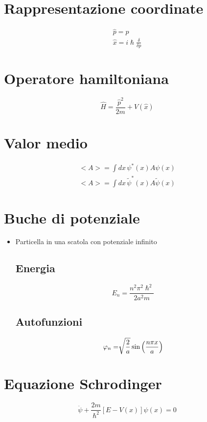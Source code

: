 \section{Rappresentazione coordinate}
\begin{gather*}
    \hat{p} = p \\
    \hat{x} = i \hslash \frac{\delta}{\delta p}
\end{gather*}

\section{Operatore hamiltoniana}
\begin{equation*}
    \hat{H} = \frac{\hat{p}^2}{2m} + V(\hat{x})
\end{equation*}

\section{Valor medio}
\begin{gather*}
    <A> = \int dx \, \psi^*(x)A\psi(x) \\
    <A> = \int dx \, \tilde{\psi}^*(x) A \tilde{\psi}(x)
\end{gather*}

\section{Buche di potenziale}

\begin{itemize}
    \item Particella in una scatola con potenziale infinito
        \subsection*{Energia}
        \begin{equation*}
            E_n = \frac{n^2 \pi^2 \hslash^2}{2a^2m}
        \end{equation*}
        \subsection*{Autofunzioni}
        \begin{equation*}
            \varphi_n = \sqrt[]{\frac{2}{a}}\sin \left(\frac{n\pi x}{a}\right)
        \end{equation*}
\end{itemize}

\section{Equazione Schrodinger}
\begin{equation*}
    \ddot{\psi} + \frac{2m}{\hslash^2}[E-V(x)]\psi(x) = 0
\end{equation*}


